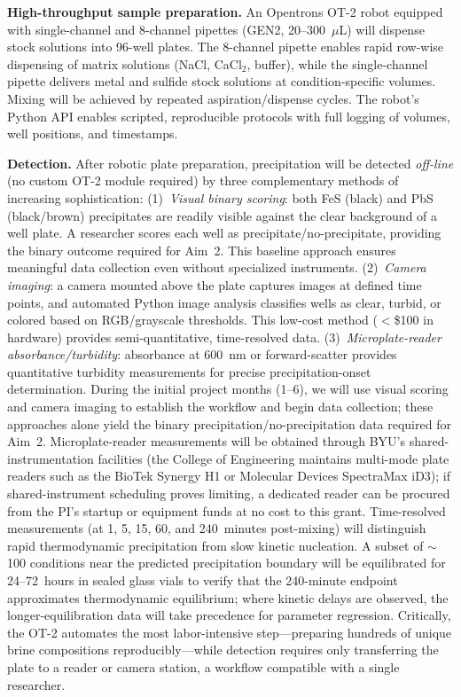 \documentclass[12pt]{article}
\begin{document}
\textbf{High-throughput sample preparation.} An Opentrons OT-2 robot equipped with single-channel and 8-channel pipettes (GEN2, 20--300~$\mu$L) will dispense stock solutions into 96-well plates. The 8-channel pipette enables rapid row-wise dispensing of matrix solutions (NaCl, CaCl$_2$, buffer), while the single-channel pipette delivers metal and sulfide stock solutions at condition-specific volumes. Mixing will be achieved by repeated aspiration/dispense cycles. The robot's Python API enables scripted, reproducible protocols with full logging of volumes, well positions, and timestamps.

\textbf{Detection.} After robotic plate preparation, precipitation will be detected \textit{off-line} (no custom OT-2 module required) by three complementary methods of increasing sophistication: (1)~\textit{Visual binary scoring}: both FeS (black) and PbS (black/brown) precipitates are readily visible against the clear background of a well plate. A researcher scores each well as precipitate/no-precipitate, providing the binary outcome required for Aim~2. This baseline approach ensures meaningful data collection even without specialized instruments. (2)~\textit{Camera imaging}: a camera mounted above the plate captures images at defined time points, and automated Python image analysis classifies wells as clear, turbid, or colored based on RGB/grayscale thresholds. This low-cost method ($<$\$100 in hardware) provides semi-quantitative, time-resolved data. (3)~\textit{Microplate-reader absorbance/turbidity}: absorbance at 600~nm or forward-scatter provides quantitative turbidity measurements for precise precipitation-onset determination. During the initial project months (1--6), we will use visual scoring and camera imaging to establish the workflow and begin data collection; these approaches alone yield the binary precipitation/no-precipitation data required for Aim~2. Microplate-reader measurements will be obtained through BYU's shared-instrumentation facilities (the College of Engineering maintains multi-mode plate readers such as the BioTek Synergy H1 or Molecular Devices SpectraMax iD3); if shared-instrument scheduling proves limiting, a dedicated reader can be procured from the PI's startup or equipment funds at no cost to this grant. Time-resolved measurements (at 1, 5, 15, 60, and 240~minutes post-mixing) will distinguish rapid thermodynamic precipitation from slow kinetic nucleation. A subset of $\sim$100 conditions near the predicted precipitation boundary will be equilibrated for 24--72~hours in sealed glass vials to verify that the 240-minute endpoint approximates thermodynamic equilibrium; where kinetic delays are observed, the longer-equilibration data will take precedence for parameter regression. Critically, the OT-2 automates the most labor-intensive step---preparing hundreds of unique brine compositions reproducibly---while detection requires only transferring the plate to a reader or camera station, a workflow compatible with a single researcher.
\end{document}

